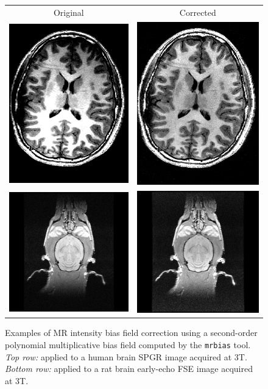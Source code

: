 \documentclass{InsightArticle}
\begin{document}
\begin{figure}[tbp]
\begin{center}
\begin{tabular}{cc}
Original & Corrected \\
\includegraphics[width=.3\linewidth]{img/mrbias_orig}&
\includegraphics[width=.3\linewidth]{img/mrbias_corr} \\
\includegraphics[width=.3\linewidth]{img/mrbias_rat_early_orig}&
\includegraphics[width=.3\linewidth]{img/mrbias_rat_early_corr}
\end{tabular}
\end{center}
\caption{Examples of MR intensity bias field correction using a second-order
polynomial multiplicative bias field computed by the {\tt mrbias} tool. {\em
  Top row:\/} applied to a human brain SPGR image acquired at 3T.  {\em
  Bottom row:\/} applied to a rat brain early-echo FSE image acquired at 3T.}
\label{fig:Mrbias}
\end{figure}
\end{document}
